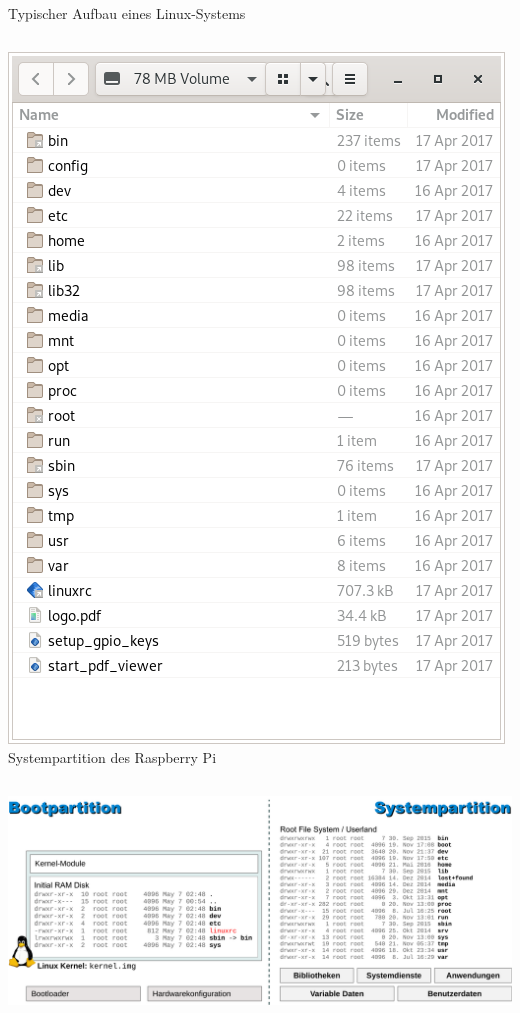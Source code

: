 {\begin{frame}[allowframebreaks]{Typischer Aufbau eines Linux-Systems}
\begin{columns}
        \begin{center}
            \includegraphics[width=\textwidth]{8-linux/img/partition-system}
            \smallskip
            Systempartition des Raspberry Pi
        \end{center}
    \end{columns}

    \framebreak
    \includegraphics[width=\textwidth]{8-linux/img/linux-aufbau}
    \smallskip


\end{frame}}
